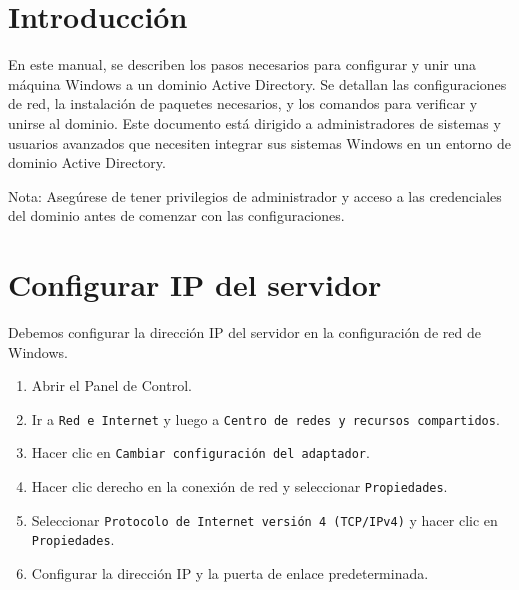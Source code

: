 \documentclass[11pt]{article}
\begin{document}
    


    \section{Introducción}

    En este manual, se describen los pasos necesarios para configurar y unir una máquina Windows a un dominio Active Directory. Se detallan las configuraciones de red, la instalación de paquetes necesarios, y los comandos para verificar y unirse al dominio. Este documento está dirigido a administradores de sistemas y usuarios avanzados que necesiten integrar sus sistemas Windows en un entorno de dominio Active Directory.

    \begin{tcolorbox}[note]
        Nota: Asegúrese de tener privilegios de administrador y acceso a las credenciales del dominio antes de comenzar con las configuraciones.
    \end{tcolorbox}

    \section{Configurar IP del servidor}
    Debemos configurar la dirección IP del servidor en la configuración de red de Windows.

    \begin{enumerate}
        \item Abrir el Panel de Control.
        \item Ir a \texttt{Red e Internet} y luego a \texttt{Centro de redes y recursos compartidos}.
        \item Hacer clic en \texttt{Cambiar configuración del adaptador}.
        \item Hacer clic derecho en la conexión de red y seleccionar \texttt{Propiedades}.
        \item Seleccionar \texttt{Protocolo de Internet versión 4 (TCP/IPv4)} y hacer clic en \texttt{Propiedades}.
        \item Configurar la dirección IP y la puerta de enlace predeterminada.
    \end{enumerate}
\end{document}
